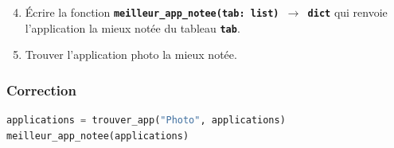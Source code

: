 \documentclass[svgnames,11pt]{beamer}
\begin{document}
\begin{frame}
    \frametitle{}
    \setcounter{compteuractivite}{3}
    \begin{activite}
        \begin{enumerate}
            \setcounter{enumi}{3}

            \item Écrire la fonction \textbf{\texttt{meilleur\_app\_notee(tab: list) $\rightarrow$ dict}} qui renvoie l'application la mieux notée du tableau \texttt{\textbf{tab}}.
            \item Trouver l'application photo la mieux notée.
        \end{enumerate}
    \end{activite}

\end{frame}
\begin{frame}[fragile]
    \frametitle{Correction}

    
    \begin{center}
        \begin{lstlisting}[language=Python, basicstyle=\ttfamily\small, xleftmargin=1em, xrightmargin=0em]
applications = trouver_app("Photo", applications)
meilleur_app_notee(applications)
\end{lstlisting}
    \end{center}

\end{frame}
\end{document}
